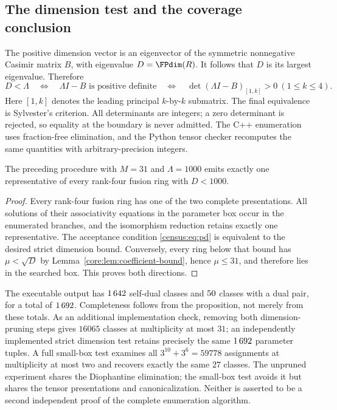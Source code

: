 \subsection{The dimension test and the coverage conclusion}
The positive dimension vector is an eigenvector of the symmetric
nonnegative Casimir matrix $B$, with eigenvalue $D=\FPdim(R)$.
It follows that $D$ is its largest eigenvalue. Therefore
\begin{equation}\label{census:eq:pd}
 D<\Lambda\quad\Longleftrightarrow\quad
 \Lambda I-B\text{ is positive definite}
 \quad\Longleftrightarrow\quad
 \det(\Lambda I-B)_{[1,k]}>0\ (1\leq k\leq4).
\end{equation}
Here $[1,k]$ denotes the leading principal $k$-by-$k$ submatrix.
The final equivalence is Sylvester's criterion. All determinants are
integers; a zero determinant is rejected, so equality at the boundary
is never admitted. The C++ enumeration uses fraction-free elimination,
and the Python tensor checker recomputes the same quantities with
arbitrary-precision integers.

\begin{proposition}\label{census:prop:coverage}
The preceding procedure with $M=31$ and $\Lambda=1000$ emits exactly
one representative of every rank-four fusion ring with $D<1000$.
\end{proposition}
\begin{proof}
Every rank-four fusion ring has one of the two complete presentations.
All solutions of their associativity equations in the parameter box
occur in the enumerated branches, and the isomorphism reduction retains
exactly one representative. The acceptance condition
\eqref{census:eq:pd} is equivalent to the desired strict dimension
bound. Conversely, every ring below that bound has $\mu<\sqrt D$
by Lemma~\ref{core:lem:coefficient-bound}, hence $\mu\leq31$, and therefore
lies in the searched box. This proves both directions.
\end{proof}

The executable output has $1\,642$ self-dual classes and
$50$ classes with a dual pair, for a total of $1\,692$.
Completeness follows from the proposition, not merely from these totals.
As an additional implementation check, removing both dimension-pruning
steps gives $16065$ classes at multiplicity at most $31$; an independently
implemented strict dimension test retains precisely the same $1\,692$
parameter tuples. A full small-box test examines all
$3^{10}+3^6=59778$ assignments at multiplicity at most two and recovers
exactly the same $27$ classes. The unpruned experiment shares the
Diophantine elimination; the small-box test avoids it but shares the
tensor presentations and canonicalization. Neither is asserted to be a
second independent proof of the complete enumeration algorithm.
